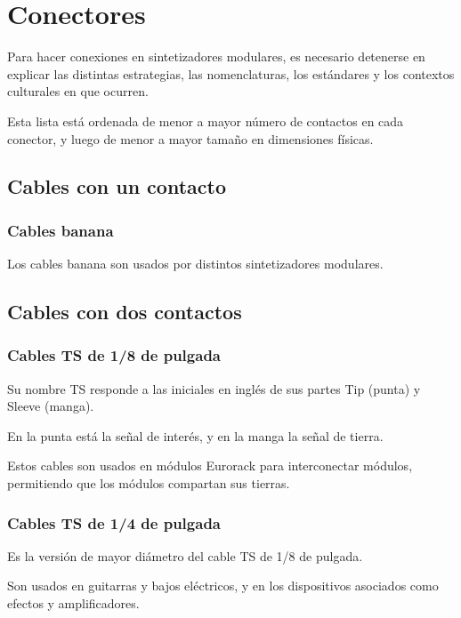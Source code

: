 \documentclass[../candidatura.tex]{subfiles}
\begin{document}
\section{Conectores}

\avisoesbozo

Para hacer conexiones en sintetizadores modulares, es necesario detenerse en explicar las distintas estrategias, las nomenclaturas, los estándares y los contextos culturales en que ocurren.

Esta lista está ordenada de menor a mayor número de contactos en cada conector, y luego de menor a mayor tamaño en dimensiones físicas.

\subsection{Cables con un contacto}

\subsubsection{Cables banana}

Los cables banana son usados por distintos sintetizadores modulares.

\subsection{Cables con dos contactos}

\subsubsection{Cables TS de 1/8 de pulgada}

Su nombre TS responde a las iniciales en inglés de sus partes Tip (punta) y Sleeve (manga).

En la punta está la señal de interés, y en la manga la señal de tierra.

Estos cables son usados en módulos Eurorack para interconectar módulos, permitiendo que los módulos compartan sus tierras.

\subsubsection{Cables TS de 1/4 de pulgada}

Es la versión de mayor diámetro del cable TS de 1/8 de pulgada.

Son usados en guitarras y bajos eléctricos, y en los dispositivos asociados como efectos y amplificadores.
\end{document}
